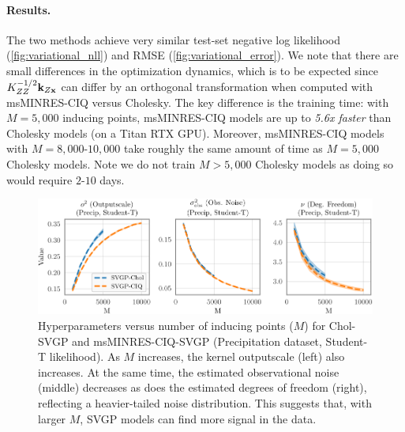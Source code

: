 \paragraph{Results.}
The two methods achieve very similar test-set negative log likelihood (\cref{fig:variational_nll}) and RMSE (\cref{fig:variational_error}).
We note that there are small
differences in the optimization dynamics, which is to be expected since $K_{ZZ}^{-1/2} \mathbf{k}_{Z\mathbf{x}}$ can differ by an orthogonal
transformation when computed with msMINRES-CIQ versus Cholesky.
The key difference is the training time:
with $M=5,\!000$ inducing points, msMINRES-CIQ models are up to \emph{5.6x faster} than Cholesky models (on a Titan RTX GPU).
Moreover, msMINRES-CIQ models with $M=8,\!000$-$10,\!000$ take roughly the same amount of time as $M=5,\!000$ Cholesky models.
Note we do not train $M > 5,\!000$ Cholesky models as doing so would require $2$-$10$ days.

\begin{figure}[t!]
  \centering
  \includegraphics[width=\linewidth]{figures/variational_stats.pdf}
  \caption[Hyperparameters of Cholesky and msMINRES-CIQ SVGP models.]{
    Hyperparameters versus number of inducing points ($M$) for Chol-SVGP and msMINRES-CIQ-SVGP (Precipitation dataset, Student-T likelihood).
    As $M$ increases, the kernel outputscale (left) also increases.
    At the same time, the estimated observational noise (middle) decreases as does the estimated degrees of freedom (right), reflecting a heavier-tailed noise distribution.
    This suggests that, with larger $M$, SVGP models can find more signal in the data.
  }
  \label{fig:variational_stats}
\end{figure}

